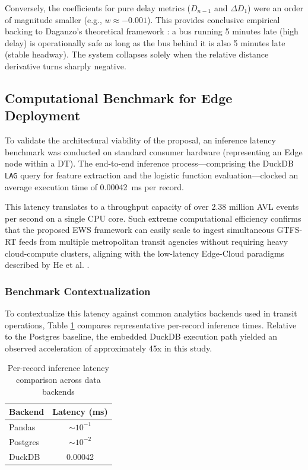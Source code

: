 \documentclass[journal,twocolumn]{IEEEtran}
\begin{document}
Conversely, the coefficients for pure delay metrics ($D_{n-1}$ and $\Delta D_{1}$) were an order of magnitude smaller (e.g., $w \approx -0.001$). This provides conclusive empirical backing to Daganzo's theoretical framework \cite{1}: a bus running 5 minutes late (high delay) is operationally safe as long as the bus behind it is also 5 minutes late (stable headway). The system collapses solely when the relative distance derivative turns sharply negative.

\subsection{Computational Benchmark for Edge Deployment}
To validate the architectural viability of the proposal, an inference latency benchmark was conducted on standard consumer hardware (representing an Edge node within a DT). The end-to-end inference process---comprising the DuckDB \texttt{LAG} query for feature extraction and the logistic function evaluation---clocked an average execution time of \SI{0.00042}{\ms} per record.

This latency translates to a throughput capacity of over 2.38 million AVL events per second on a single CPU core. Such extreme computational efficiency confirms that the proposed EWS framework can easily scale to ingest simultaneous GTFS-RT feeds from multiple metropolitan transit agencies without requiring heavy cloud-compute clusters, aligning with the low-latency Edge-Cloud paradigms described by He et al. \cite{26}.

\subsubsection{Benchmark Contextualization}
To contextualize this latency against common analytics backends used in transit operations, Table \ref{tab:benchmark_context} compares representative per-record inference times. Relative to the Postgres baseline, the embedded DuckDB execution path yielded an observed acceleration of approximately 45x in this study.

\begin{table}[htbp]
	\caption{Per-record inference latency comparison across data backends}
	\centering
	\begin{tabular}{@{}lc@{}}
		\toprule
		\textbf{Backend} & \textbf{Latency (ms)} \\ \midrule
		Pandas           & $\sim 10^{-1}$        \\
		Postgres         & $\sim 10^{-2}$        \\
		DuckDB           & 0.00042               \\ \bottomrule
	\end{tabular}
	\label{tab:benchmark_context}
\end{table}
\end{document}
